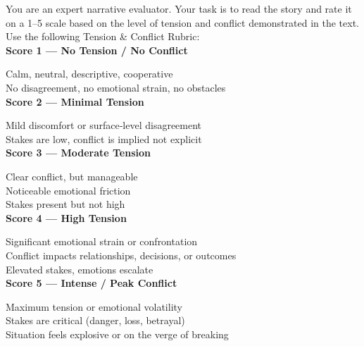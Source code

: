\begin{center}
\label{fig:audit-prompt}
\end{center}

\begin{tcolorbox}[
  enhanced jigsaw,
  breakable,
  colback=blue!5!white,
  colframe=blue!75!black,
  title=Feature Table Construction,
  rounded corners
]
You are an expert narrative evaluator.
Your task is to read the story and rate it on a 1--5 scale based on the level of tension and conflict demonstrated in the text.
Use the following Tension \& Conflict Rubric:
\\[0.5\baselineskip]
\textbf{Score 1 --- No Tension / No Conflict}

Calm, neutral, descriptive, cooperative \\
No disagreement, no emotional strain, no obstacles
\\[0.5\baselineskip]
\textbf{Score 2 --- Minimal Tension}

Mild discomfort or surface‑level disagreement \\
Stakes are low, conflict is implied not explicit
\\[0.5\baselineskip]
\textbf{Score 3 --- Moderate Tension}

Clear conflict, but manageable \\
Noticeable emotional friction \\
Stakes present but not high
\\[0.5\baselineskip]
\textbf{Score 4 --- High Tension}

Significant emotional strain or confrontation \\
Conflict impacts relationships, decisions, or outcomes \\
Elevated stakes, emotions escalate
\\[0.5\baselineskip]
\textbf{Score 5 --- Intense / Peak Conflict}

Maximum tension or emotional volatility \\
Stakes are critical (danger, loss, betrayal) \\
Situation feels explosive or on the verge of breaking
\end{tcolorbox}
\begin{center}
\label{table_construction}
\end{center}
